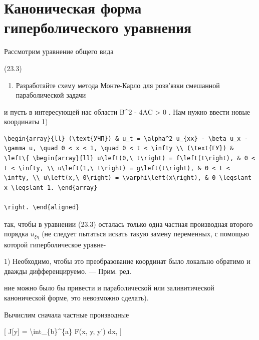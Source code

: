\documentclass[
]{article}
\providecommand{\tightlist}{%
  \setlength{\itemsep}{0pt}\setlength{\parskip}{0pt}}
\begin{document}
\section{Каноническая форма гиперболического
уравнения}\label{ux43aux430ux43dux43eux43dux438ux447ux435ux441ux43aux430ux44f-ux444ux43eux440ux43cux430-ux433ux438ux43fux435ux440ux431ux43eux43bux438ux447ux435ux441ux43aux43eux433ux43e-ux443ux440ux430ux432ux43dux435ux43dux438ux44f}

Рассмотрим уравнение общего вида

(23.3)

\begin{enumerate}
\def\labelenumi{\arabic{enumi}.}
\setcounter{enumi}{4}
\tightlist
\item
  Разработайте схему метода Монте-Карло для розв'язки смешанной
  параболической задачи
\end{enumerate}

и пусть в интересующей нас области B\^{}2 - 4AC \textgreater{} 0 . Нам
нужно ввести новые координаты 1)

\begin{verbatim}
\begin{array}{ll} (\text{УЧП}) & u_t = \alpha^2 u_{xx} - \beta u_x - \gamma u, \quad 0 < x < 1, \quad 0 < t < \infty \\ (\text{ГУ}) & \left\{ \begin{array}{ll} u\left(0,\ t\right) = f\left(t\right), & 0 < t < \infty, \\ u\left(1,\ t\right) = g\left(t\right), & 0 < t < \infty, \\ u\left(x,\ 0\right) = \varphi\left(x\right), & 0 \leqslant x \leqslant 1. \end{array}

\right. \end{aligned}
\end{verbatim}

так, чтобы в уравнении (23.3) осталась только одна частная производная
второго порядка \(u_{\xi\eta}\) (не следует пытаться искать такую замену
переменных, с помощью которой гиперболическое уравне-

1) Необходимо, чтобы это преобразование координат было локально обратимо
и дважды дифференцируемо. --- Прим. ред.

ние можно было бы привести и параболической или заливитической
канонической форме, это невозможно сделать).

Вычислим сначала частные производные

{[} J{[}y{]} = \textbackslash int\_\{b\}\^{}\{a\} F(x, y, y') dx, {]}
\end{document}
